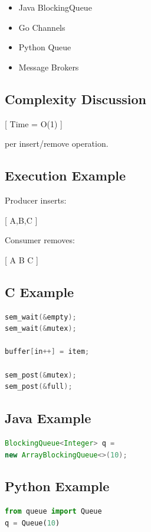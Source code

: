 \begin{itemize}
\item Java BlockingQueue
\item Go Channels
\item Python Queue
\item Message Brokers
\end{itemize}

\subsection{Complexity Discussion}

[
Time = O(1)
]

per insert/remove operation.

\subsection{Execution Example}

Producer inserts:

[
A,B,C
]

Consumer removes:

[
A \rightarrow B \rightarrow C
]

\subsection{C Example}

\begin{lstlisting}[language=C,style=interviewcode]
sem_wait(&empty);
sem_wait(&mutex);

buffer[in++] = item;

sem_post(&mutex);
sem_post(&full);
\end{lstlisting}

\subsection{Java Example}

\begin{lstlisting}[language=Java,style=interviewcode]
BlockingQueue<Integer> q =
new ArrayBlockingQueue<>(10);
\end{lstlisting}

\subsection{Python Example}

\begin{lstlisting}[language=Python,style=interviewcode]
from queue import Queue
q = Queue(10)
\end{lstlisting}


